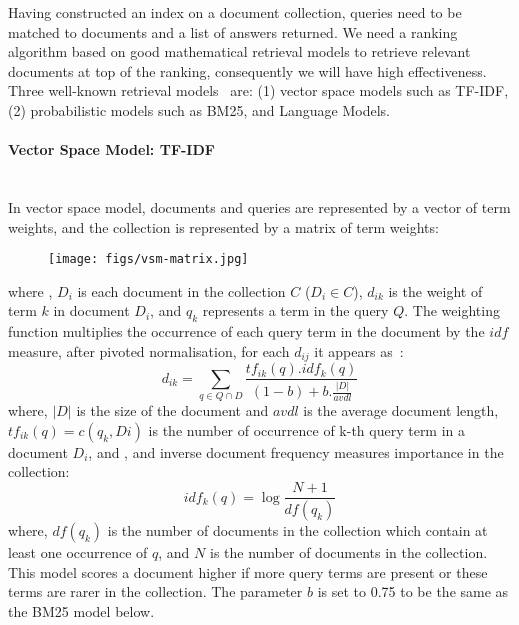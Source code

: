Having constructed an index on a document collection, queries need to 
be matched to documents and a list of answers returned. We need a ranking algorithm based on good mathematical retrieval models to 
retrieve relevant documents at top of the ranking, consequently we will have high effectiveness. 
Three well-known retrieval models~\citep{croft2010search} are: (1) vector space models such as TF-IDF, (2) probabilistic models such as BM25, and Language Models. 

\paragraph{Vector Space Model: TF-IDF}
\ \\
In vector space model, documents and queries are represented by a vector of term weights, and the collection is represented by a matrix of term weights: 
\capstartfalse
\begin{figure}[htpb]
   \centering
   \texttt{[image: figs/vsm-matrix.jpg]}
\end{figure}
\capstarttrue
\FloatBarrier 
\noindent
where , $ D_{i} $ is each document in the collection $ C $ ($ D_{i}\in C $), $ d_{ik} $ is the weight of term $ k $ in document $ D_{i} $, and $ q_{k} $ represents a term in the query $ Q $.
The weighting function multiplies the occurrence of each query term in the document
by the $ idf $ measure, after pivoted normalisation, for each $ d_{ij} $ it appears as~\citep{bache2010improving}:
\begin{equation}
d_{ik}=\sum\limits_{q \in Q\cap D}\frac{tf_{ik}(q).idf_{k}(q)}{(1-b)+b.\frac{|D|}{avdl}}
\label{eq:tfidf}
\end{equation}
where, $ |D| $ is the size of the document and $ avdl $ is the average document length, $ tf_{ik}(q)=c(q_{k},Di)$ is the number of occurrence of k-th query term in a document $ D_{i} $, and , and inverse document frequency measures importance in the collection: 
\begin{equation}
idf_{k}(q)=\log\frac{N+1}{df(q_{k})}
\label{eq:idf}
\end{equation}
where, $ df(q_{k}) $ is the number of documents in the collection which contain at least one occurrence of $ q $, and $ N $ is the number of documents in the collection. 
This model scores a document higher if more query terms are present or these terms are rarer in the collection. The parameter $ b $ is set to 0.75 to be the same as the BM25 model below.
